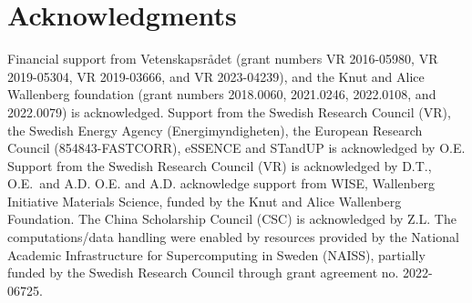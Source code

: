 \section{Acknowledgments}


Financial support from Vetenskapsrådet (grant numbers VR 2016-05980, VR 2019-05304, VR 2019-03666, and VR 2023-04239), and the Knut and Alice Wallenberg foundation (grant numbers 2018.0060, 2021.0246, 2022.0108, and 2022.0079) is acknowledged. Support from the Swedish Research Council (VR), the Swedish Energy Agency (Energimyndigheten), the European Research Council (854843-FASTCORR), eSSENCE and STandUP is acknowledged by O.E. Support from the Swedish Research Council (VR) is acknowledged by D.T., O.E.~and A.D. O.E. and A.D. acknowledge support from WISE, Wallenberg Initiative Materials Science, funded by the Knut and Alice Wallenberg Foundation. 
The China Scholarship Council (CSC) is acknowledged by Z.L. The computations/data handling were enabled by resources provided by the National Academic Infrastructure for Supercomputing in Sweden (NAISS), partially funded by the Swedish Research Council through grant agreement no. 2022-06725.
